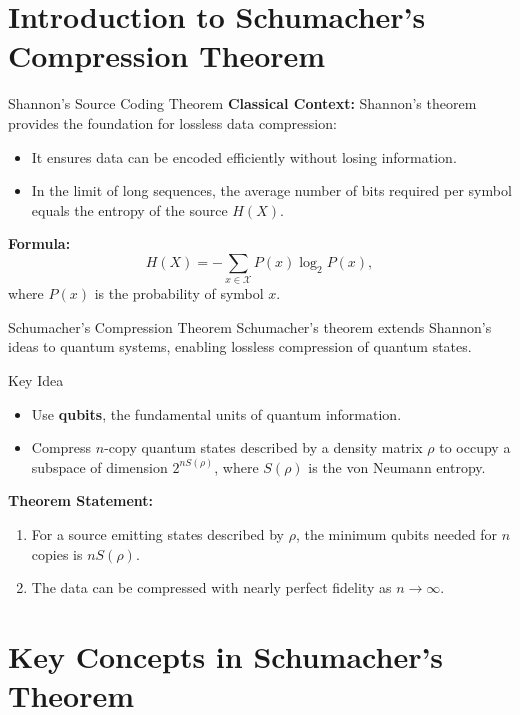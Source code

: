 \section{Introduction to Schumacher's Compression Theorem}

\begin{frame}{Shannon's Source Coding Theorem}
    \textbf{Classical Context:} Shannon's theorem provides the foundation for lossless data compression:
    \begin{itemize}
        \item It ensures data can be encoded efficiently without losing information.
        \item In the limit of long sequences, the average number of bits required per symbol equals the entropy of the source \( H(X) \).
    \end{itemize}
    \textbf{Formula:}
    \[
    H(X) = -\sum_{x \in \mathcal{X}} P(x) \log_2 P(x),
    \]
    where \( P(x) \) is the probability of symbol \( x \).
\end{frame}

\begin{frame}{Schumacher's Compression Theorem}
    Schumacher's theorem extends Shannon's ideas to quantum systems, enabling lossless compression of quantum states.
    \begin{block}{Key Idea}
        \begin{itemize}
            \item Use \textbf{qubits}, the fundamental units of quantum information.
            \item Compress \( n \)-copy quantum states described by a density matrix \( \rho \) to occupy a subspace of dimension \( 2^{n S(\rho)} \), where \( S(\rho) \) is the von Neumann entropy.
        \end{itemize}
    \end{block}
    \textbf{Theorem Statement:}
    \begin{enumerate}
        \item For a source emitting states described by \( \rho \), the minimum qubits needed for \( n \) copies is \( n S(\rho) \).
        \item The data can be compressed with nearly perfect fidelity as \( n \to \infty \).
    \end{enumerate}
\end{frame}

\section{Key Concepts in Schumacher's Theorem}

